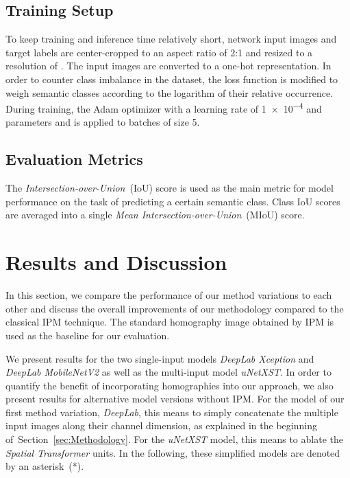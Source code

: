 \documentclass[a4paper, 10pt, conference]{ieeeconf}
\newcommand{\sect}[1]{Section~\ref{#1}}
\begin{document}
\begin{itemize}
\subsection{Training Setup}

To keep training and inference time relatively short, network input images and target labels are center-cropped to an aspect ratio of 2:1 and resized to a resolution of . The input images are converted to a one-hot representation. In order to counter class imbalance in the dataset, the loss function is modified to weigh semantic classes according to the logarithm of their relative occurrence. During training, the Adam optimizer with a learning rate of 
\num{1e-4} and parameters  and  is applied to batches of size \num{5}.

\subsection{Evaluation Metrics}

The \textit{Intersection-over-Union}~(IoU) score is used as the main metric for model performance on the task of predicting a certain semantic class. Class IoU scores are averaged into a single \textit{Mean Intersection-over-Union}~(MIoU) score.


\section{Results and Discussion}\label{sect:ResultsAndDiscussion}

In this section, we compare the performance of our method variations to each other and discuss the overall improvements of our methodology compared to the classical IPM technique. The standard homography image obtained by IPM is used as the baseline for our evaluation.

We present results for the two single-input models \textit{DeepLab Xception} and \textit{DeepLab MobileNetV2} as well as the multi-input model \textit{uNetXST}. In order to quantify the benefit of incorporating homographies into our approach, we also present results for alternative model versions without IPM. For the model of our first method variation, \textit{DeepLab}, this means to simply concatenate the multiple input images along their channel dimension, as explained in the beginning of~\sect{sec:Methodology}. For the \textit{uNetXST} model, this means to ablate the \textit{Spatial Transformer} units. In the following, these simplified models are denoted by an asterisk~(*).


\end{itemize}
\end{document}
